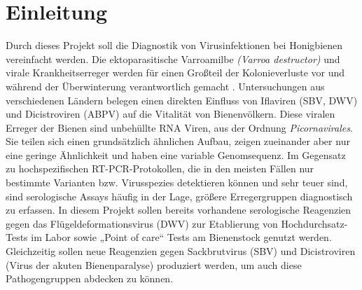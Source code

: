 
\section{Einleitung}
Durch dieses Projekt soll die Diagnostik von Virusinfektionen bei Honigbienen vereinfacht werden. Die ektoparasitische Varroamilbe \textit{(Varroa destructor)} und virale Krankheitserreger werden für einen Großteil der Kolonieverluste vor \citep{dainat2012} und während der Überwinterung verantwortlich gemacht \citep{Kielmanowicz2015}. Untersuchungen aus verschiedenen Ländern belegen einen direkten Einfluss von Iflaviren (SBV, DWV) und Dicistroviren (ABPV) auf die Vitalität von Bienenvölkern. Diese viralen Erreger der Bienen sind unbehüllte RNA Viren, aus der Ordnung \textit{Picornavirales}. Sie teilen sich einen grundsätzlich ähnlichen Aufbau, zeigen zueinander aber nur eine geringe Ähnlichkeit und haben eine variable Genomsequenz. Im Gegensatz zu hochspezifischen RT-PCR-Protokollen, die in den meisten Fällen nur bestimmte Varianten bzw. Virusspezies detektieren können und sehr teuer sind, sind serologische Assays häufig in der Lage, größere Erregergruppen diagnostisch zu erfassen. In diesem Projekt sollen bereits vorhandene serologische Reagenzien gegen das Flügeldeformationsvirus (DWV) zur Etablierung von Hochdurchsatz-Tests im Labor sowie „Point of care“ Tests am Bienenstock genutzt werden. Gleichzeitig sollen neue Reagenzien gegen Sackbrutvirus (SBV) und Dicistroviren (Virus der akuten Bienenparalyse) produziert werden, um auch diese Pathogengruppen abdecken zu können. 
\\
\\
